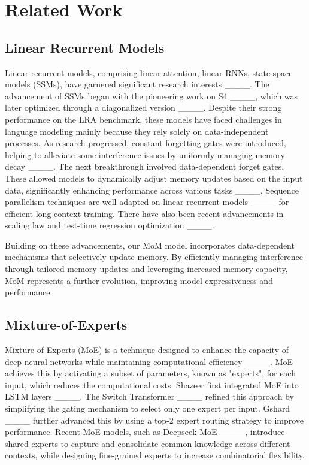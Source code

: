 \section{Related Work}
\subsection*{Linear Recurrent Models}
Linear recurrent models, comprising linear attention, linear RNNs, state-space models (SSMs), have garnered significant research interests ____. The advancement of SSMs began with the pioneering work on S4 ____, which was later optimized through a diagonalized version ____. Despite their strong performance on the LRA benchmark, these models have faced challenges in language modeling mainly because they rely solely on data-independent processes. As research progressed, constant forgetting gates were introduced, helping to alleviate some interference issues by uniformly managing memory decay ____. The next breakthrough involved data-dependent forget gates. These allowed models to dynamically adjust memory updates based on the input data, significantly enhancing performance across various tasks ____. Sequence parallelism techniques are well adapted on linear recurrent models ____ for efficient long context training. There have also been recent advancements in scaling law and test-time regression optimization ____.

Building on these advancements, our MoM model incorporates data-dependent mechanisms that selectively update memory. By efficiently managing interference through tailored memory updates and leveraging increased memory capacity, MoM represents a further evolution, improving model expressiveness and performance.

\subsection*{Mixture-of-Experts}
Mixture-of-Experts (MoE) is a technique designed to enhance the capacity of deep neural networks while maintaining computational efficiency ____. MoE achieves this by activating a subset of parameters, known as "experts", for each input, which reduces the computational costs. Shazeer first integrated MoE into LSTM layers ____. The Switch Transformer ____ refined this approach by simplifying the gating mechanism to select only one expert per input. Gshard ____ further advanced this by using a top-2 expert routing strategy to improve performance. Recent MoE models, such as Deepseek-MoE ____, introduce shared experts to capture and consolidate common knowledge across different contexts, while designing fine-grained experts to increase combinatorial flexibility.